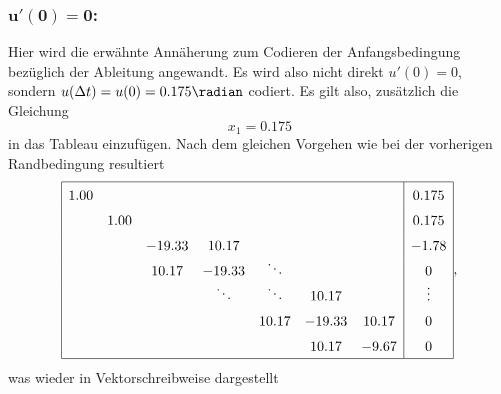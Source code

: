\subsubsection{$\mathbf{u'(0) = 0}$:}
Hier wird die erwähnte Annäherung zum Codieren der Anfangsbedingung
bezüglich der Ableitung angewandt.
Es wird also nicht direkt $u'(0) = 0 $, sondern $u(\Delta t) = u(0)
= 0.175 \radian$ codiert.
Es gilt also, zusätzlich die Gleichung
\begin{equation*}
    x_1 = 0.175
\end{equation*}
in das Tableau einzufügen.
Nach dem gleichen Vorgehen wie bei der vorherigen Randbedingung resultiert
\begin{equation*}
    \def\arraystretch{1.5}
    \begin{array}{|ccccccc|c|}
        \hline
         1.00  &        &        &                &                &        &        & 0.175          \\
               &  1.00  &        &                &                &        &        & 0.175          \\
               &        &-19.33  & 10.17          &                &        &        & -1.78          \\
               &        & 10.17  &-19.33          & \smash{\ddots} &        &        & 0              \\
               &        &        & \smash{\ddots} & \smash{\ddots} & 10.17  &        & \smash{\vdots} \\
               &        &        &                & 10.17          &-19.33  & 10.17  & 0              \\
               &        &        &                &                & 10.17  & -9.67  & 0              \\
        \hline
    \end{array},
\end{equation*}
was wieder in Vektorschreibweise dargestellt
%
